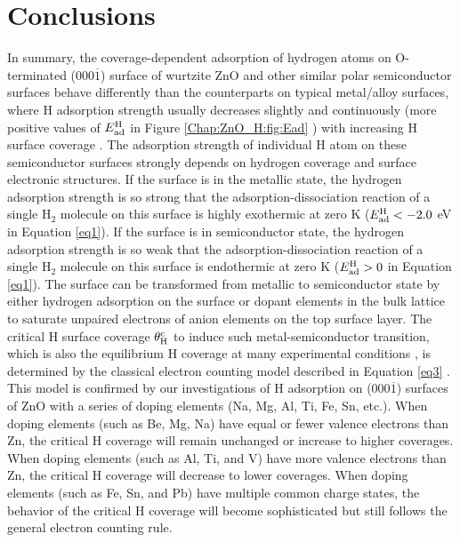 \section{Conclusions}

In summary, the coverage-dependent adsorption of hydrogen atoms on O-terminated (000$\overline{1}$) surface of wurtzite ZnO and other similar polar semiconductor surfaces behave differently than the counterparts on typical metal/alloy surfaces, where H adsorption strength usually decreases slightly and continuously (more positive values of $E_{\textup{ad}}^{\textup{H}}$ in Figure \ref{Chap:ZnO_H:fig:Ead} ) with increasing H surface coverage \cite{pallassana1999theoretical,qi2012adsorbate}. The adsorption strength of individual H atom on these semiconductor surfaces strongly depends on hydrogen coverage and surface electronic structures. If the surface is in the metallic state, the hydrogen adsorption strength is so strong that the adsorption-dissociation reaction of a single H$_2$ molecule on this surface is highly exothermic at zero K ($E_{\textup{ad}}^{\textup{H}} < -2.0 $ eV in Equation \ref{eq1}). If the surface is in semiconductor state, the hydrogen adsorption strength is so weak that the adsorption-dissociation reaction of a single H$_2$ molecule on this surface is endothermic at zero K ($E_{\textup{ad}}^{\textup{H}} > 0 $ in Equation \ref{eq1}).  The surface can be transformed from metallic to semiconductor state by either hydrogen adsorption on the surface or dopant elements in the bulk lattice to saturate unpaired electrons of anion elements on the top surface layer. The critical H surface coverage $\theta_{\textup{H}}^{\textup{c}}$ to induce such metal-semiconductor transition, which is also the equilibrium H coverage at many experimental conditions \cite{lin2007density,meyer2004first,lauritsen2011stabilization},  is determined by the classical electron counting model described in Equation \ref{eq3} \cite{pashley1989electron}. This model is confirmed by our investigations of H adsorption on (000$\overline{1}$) surfaces of ZnO with a series of doping elements (Na, Mg, Al, Ti, Fe, Sn, etc.). When doping elements (such as Be, Mg, Na) have equal or fewer valence electrons than Zn, the critical H coverage will remain unchanged or increase to higher coverages. When doping elements (such as Al, Ti, and V) have more valence electrons than Zn, the critical H coverage will decrease to lower coverages. When doping elements (such as Fe, Sn, and Pb) have multiple common charge states, the behavior of the critical H coverage will become sophisticated but still follows the general electron counting rule.

